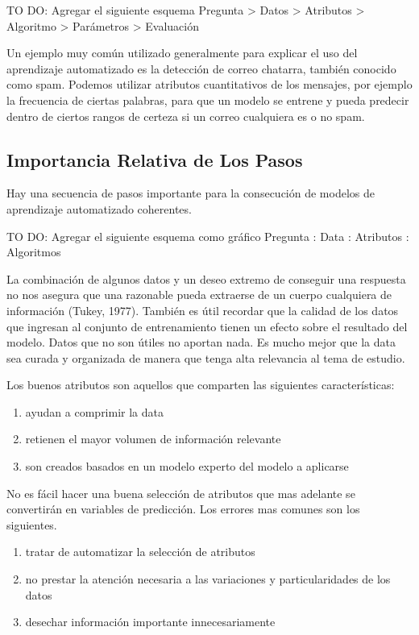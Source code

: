 TO DO: Agregar el siguiente esquema
Pregunta > Datos > Atributos > Algoritmo > Parámetros > Evaluación

Un ejemplo muy común utilizado generalmente para explicar el uso del aprendizaje automatizado es la detección de correo chatarra, también conocido como spam. Podemos utilizar atributos cuantitativos de los mensajes, por ejemplo la frecuencia de ciertas palabras, para que un modelo se entrene y pueda predecir dentro de ciertos rangos de certeza si un correo cualquiera es o no spam.

\subsection{Importancia Relativa de Los Pasos}

Hay una secuencia de pasos importante para la consecución de modelos de aprendizaje automatizado coherentes.

TO DO: Agregar el siguiente esquema como gráfico
Pregunta : Data : Atributos : Algoritmos

La combinación de algunos datos y un deseo extremo de conseguir una respuesta no nos asegura que una razonable pueda extraerse de un cuerpo cualquiera de información (Tukey, 1977). También es útil recordar que la calidad de los datos que ingresan al conjunto de entrenamiento tienen un efecto sobre el resultado del modelo. Datos que no son útiles no aportan nada. Es mucho mejor que la data sea curada y organizada de manera que tenga alta relevancia al tema de estudio.

Los buenos atributos son aquellos que comparten las siguientes características:

\begin{enumerate}
	\item ayudan a comprimir la data
	\item retienen el mayor volumen de información relevante
	\item son creados basados en un modelo experto del modelo a aplicarse
\end{enumerate}

No es fácil hacer una buena selección de atributos que mas adelante se convertirán en variables de predicción. Los errores mas comunes son los siguientes.

\begin{enumerate}
	\item tratar de automatizar la selección de atributos
	\item no prestar la atención necesaria a las variaciones y particularidades de los datos
	\item desechar información importante innecesariamente
\end{enumerate}

